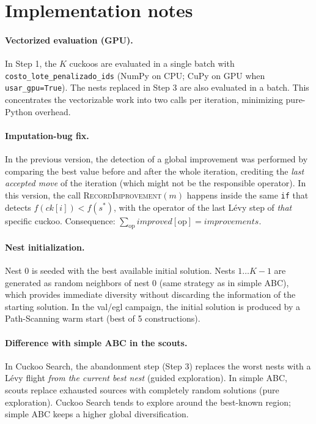 \documentclass[12pt, a4paper]{article}
\begin{document}
\section{Implementation notes}

\paragraph{Vectorized evaluation (GPU).}
In Step 1, the $K$ cuckoos are evaluated in a single batch with
\texttt{costo\_lote\_penalizado\_ids} (NumPy on CPU; CuPy on GPU when
\texttt{usar\_gpu=True}). The nests replaced in Step 3 are also evaluated in a
batch. This concentrates the vectorizable work into two calls per iteration,
minimizing pure-Python overhead.

\paragraph{Imputation-bug fix.}
In the previous version, the detection of a global improvement was performed by
comparing the best value before and after the whole iteration, crediting the
\emph{last accepted move} of the iteration (which might not be the responsible
operator). In this version, the call \textsc{RecordImprovement}$(m)$ happens
inside the same \texttt{if} that detects $f(\mathit{ck}[i]) < f(s^{*})$, with
the operator of the last L\'evy step of \emph{that} specific cuckoo.
Consequence: $\sum_{\mathrm{op}}\mathit{improved}[\mathrm{op}] = \mathit{improvements}$.

\paragraph{Nest initialization.}
Nest 0 is seeded with the best available initial solution. Nests $1 \ldots K-1$
are generated as random neighbors of nest 0 (same strategy as in simple ABC),
which provides immediate diversity without discarding the information of the
starting solution. In the val/egl campaign, the initial solution is produced by
a Path-Scanning warm start (best of 5 constructions).

\paragraph{Difference with simple ABC in the scouts.}
In Cuckoo Search, the abandonment step (Step 3) replaces the worst nests with a
L\'evy flight \emph{from the current best nest} (guided exploration). In simple
ABC, scouts replace exhausted sources with completely random solutions (pure
exploration). Cuckoo Search tends to explore around the best-known region;
simple ABC keeps a higher global diversification.
\end{document}
